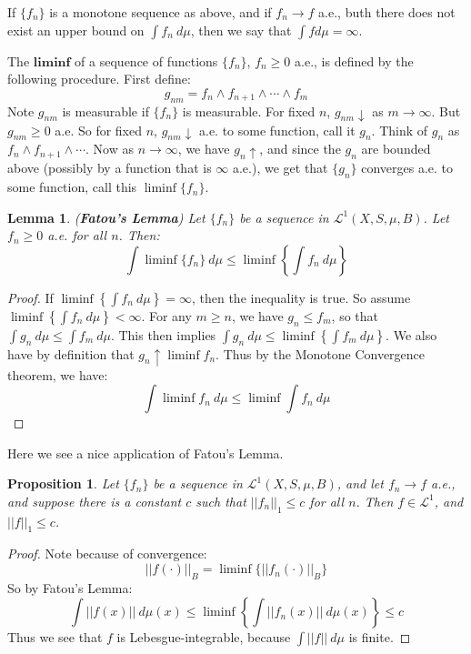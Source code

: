 \documentclass[a4paper,12pt]{report}
\newcommand{\ms}[1]{\mathscr{#1}}
\newtheorem{lemma}[theorem]{Lemma}
\newtheorem{prop}[theorem]{Proposition}
\newenvironment{definition}[1][Definition.]{\begin{trivlist}
\item[\hskip \labelsep {\bfseries #1}]}{\end{trivlist}}
\newenvironment{remark}[1][Remark.]{\begin{trivlist}
\item[\hskip \labelsep {\bfseries #1}]}{\end{trivlist}}
\begin{document}
	\begin{remark}
	If $\{f_n\}$ is a monotone sequence as above, and if $f_n \rightarrow f$ a.e., buth there does not exist an upper bound on $\int f_n ~ d\mu$, then we say that $\int f d\mu = \infty$. 
	\end{remark}
	
	\begin{definition}
	The $\textbf{liminf}$ of a sequence of functions $\{f_n\}$, $f_n \geq 0$ a.e., is defined by the following procedure. First define:
	\[ g_{nm} = f_n \wedge f_{n+1} \wedge \cdots \wedge f_m \]
	Note $g_{nm}$ is measurable if $\{f_n\}$ is measurable. For fixed $n$, $g_{nm} \downarrow$ as $m \rightarrow \infty$. But $g_{nm} \geq 0$ a.e. So for fixed $n$, $g_{nm} \downarrow$ a.e. to some function, call it $g_n$. Think of $g_n$ as $f_n \wedge f_{n+1} \wedge \cdots$. Now as $n \rightarrow \infty$, we have $g_n \uparrow$, and since the $g_n$ are bounded above (possibly by a function that is $\infty$ a.e.), we get that $\{g_n\}$ converges a.e. to some function, call this $\liminf \{f_n\}$. 
	\end{definition}
	
	
	\begin{lemma}
	\emph{(\textbf{Fatou's Lemma})}
	Let $\{f_n\}$ be a sequence in $\ms{L}^1(X, S, \mu, B)$. Let $f_n \geq 0$ a.e. for all $n$. Then:
	\[ \int \liminf \{f_n\} ~ d\mu \leq \liminf \left\{ \int f_n ~ d\mu \right\} \]
	\end{lemma}
	\begin{proof}
	If $\liminf \left\{ \int f_n ~ d\mu \right\} = \infty$, then the inequality is true. So assume $ \liminf \left\{ \int f_n ~ d\mu \right\} < \infty$. For any $m \geq n$, we have $g_n \leq f_m$, so that $\int g_n ~ d\mu \leq \int f_m ~ d\mu$. This then implies $\int g_n ~ d\mu \leq \liminf \left\{ \int f_m ~ d\mu \right\}$. We also have by definition that $g_n \uparrow \liminf f_n$. Thus by the Monotone Convergence theorem, we have:
	\[ \int \liminf f_n ~ d\mu \leq \liminf \int f_n ~ d\mu \]
	\end{proof}
	
	\noindent Here we see a nice application of Fatou's Lemma. 
	
	\begin{prop}
	Let $\{f_n\}$ be a sequence in $\ms{L}^1(X, S, \mu, B)$, and let $f_n \rightarrow f$ a.e., and suppose there is a constant $c$ such that $||f_n||_1 \leq c$ for all $n$. Then $f \in \ms{L}^1$, and $||f||_1 \leq c$. 
	\end{prop}
	\begin{proof}
	Note because of convergence:
	\[ ||f(\cdot)||_B = \liminf \{||f_n(\cdot)||_B\} \]
	So by Fatou's Lemma:
	\[ \int ||f(x)|| ~ d\mu(x) \leq \liminf \left\{ \int ||f_n(x)|| ~ d\mu(x) \right\} \leq c \]
	Thus we see that $f$ is Lebesgue-integrable, because $\int ||f|| ~ d\mu$ is finite. 
	\end{proof}
	
\end{document}

